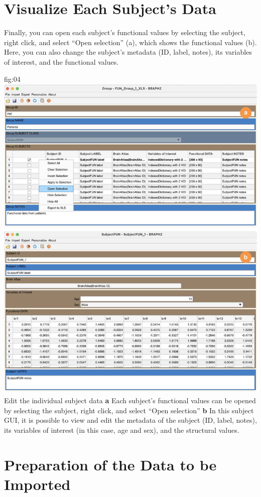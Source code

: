 \documentclass[justified]{tufte-handout}
\begin{document}
\section{Visualize Each Subject's Data}

Finally, you can open each subject's functional values by selecting the subject, right click, and select ``Open selection'' (a), which shows the functional values (b). Here, you can also change the subject's metadata (ID, label, notes), its variables of interest, and the functional values.

	{fig:04}
	{\includegraphics{fig04.jpg}
	}
	{Edit the individual subject data}
	{
	{\bf a} Each subject's functional values can be opened by selecting the subject, right click, and select ``Open selection''
	{\bf b} In this subject GUI, it is possible to view and edit the metadata of the subject (ID, label, notes), its variables of interest (in this case, age and sex), and the structural values. 
	}

\clearpage
\section{Preparation of the Data to be Imported}
\end{document}
